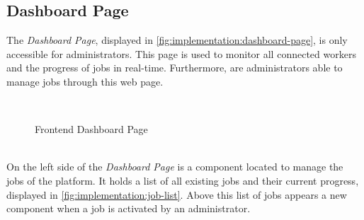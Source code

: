 \subsection{Dashboard Page}
\label{subsec:implementation:dashboard-page}
The \emph{Dashboard Page}, displayed in \autoref{fig:implementation:dashboard-page}, is only accessible for administrators. This page is used to monitor all connected workers and the progress of jobs in real-time. Furthermore, are administrators able to manage jobs through this web page.
\begin{figure}[htbp]
    \myfloatalign
     \\
    \caption{Frontend Dashboard Page}
    \label{fig:implementation:dashboard-page}
\end{figure}
~\\
On the left side of the \emph{Dashboard Page} is a component located to manage the jobs of the platform. It holds a list of all existing jobs and their current progress, displayed in \autoref{fig:implementation:job-list}. Above this list of jobs appears a new component when a job is activated by an administrator.
